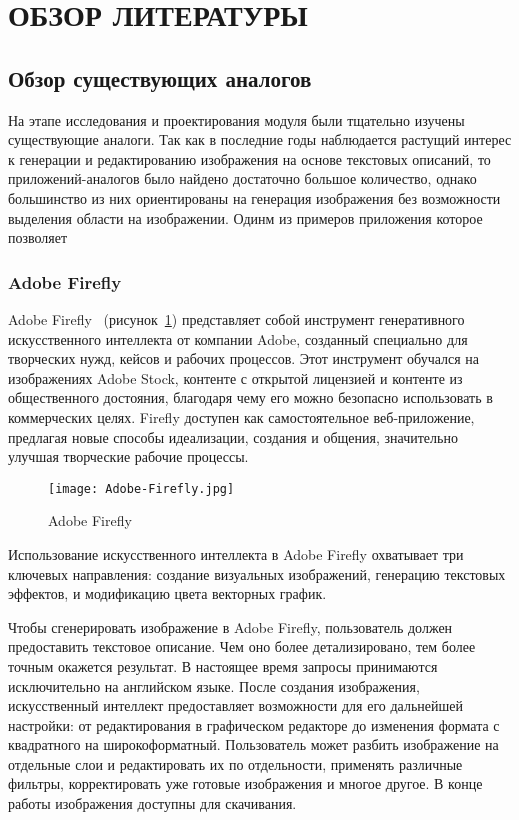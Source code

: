 \section{ОБЗОР ЛИТЕРАТУРЫ}
\label{sec:domain}

\subsection{Обзор существующих аналогов}

На этапе исследования и проектирования модуля были тщательно изучены существующие аналоги. Так как в последние годы наблюдается растущий интерес к генерации и редактированию изображения на основе текстовых описаний, то приложений-аналогов было найдено достаточно большое количество, однако большинство из них ориентированы на генерация изображения без возможности выделения области на изображении. Одинм из примеров приложения которое позволяет 

\subsubsection{Adobe Firefly}

Adobe Firefly~\cite{firefly} (рисунок~\ref{domain::adobe}) представляет собой инструмент генеративного искусственного интеллекта от компании Adobe, созданный специально для творческих нужд, кейсов и рабочих процессов. Этот инструмент обучался на изображениях Adobe Stock, контенте с открытой лицензией и контенте из общественного достояния, благодаря чему его можно безопасно использовать в коммерческих целях. Firefly доступен как самостоятельное веб-приложение, предлагая новые способы идеализации, создания и общения, значительно улучшая творческие рабочие процессы.

\begin{figure}[ht]
    \centering
    \texttt{[image: Adobe-Firefly.jpg]}
    \caption{Adobe Firefly}
    \label{domain::adobe}
\end{figure}

Использование искусственного интеллекта в Adobe Firefly охватывает три ключевых направления: создание визуальных изображений, генерацию текстовых эффектов, и модификацию цвета векторных график.

Чтобы сгенерировать изображение в Adobe Firefly, пользователь должен предоставить текстовое описание. Чем оно более детализировано, тем более точным окажется результат. В настоящее время запросы принимаются исключительно на английском языке. После создания изображения, искусственный интеллект предоставляет возможности для его дальнейшей настройки: от редактирования в графическом редакторе до изменения формата с квадратного на широкоформатный. Пользователь может разбить изображение на отдельные слои и редактировать их по отдельности, применять различные фильтры, корректировать уже готовые изображения и многое другое. В конце работы изображения доступны для скачивания.

